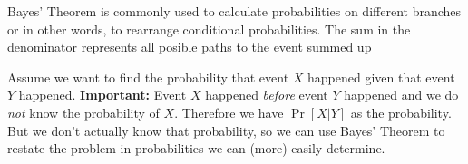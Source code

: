  Bayes' Theorem is commonly used to calculate probabilities on different branches or in other words, to rearrange conditional probabilities. The sum in the denominator represents all posible paths to the event summed up

\inlineex \hspace{0mm} Assume we want to find the probability that event $X$ happened given that event $Y$ happened. \textbf{Important:} Event $X$ happened \textit{before} event $Y$ happened and we do \textit{not} know the probability of $X$. Therefore we have $\Pr[X|Y]$ as the probability. But we don't actually know that probability, so we can use Bayes' Theorem to restate the problem in probabilities we can (more) easily determine.
